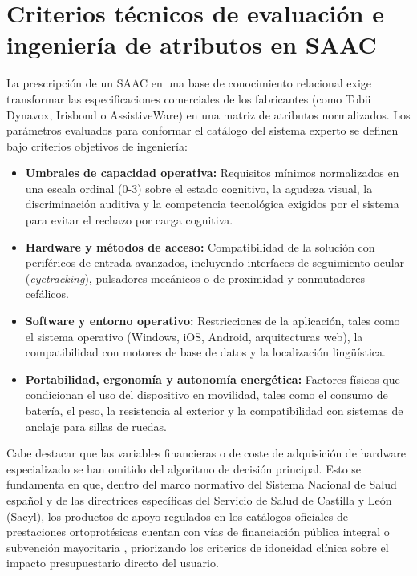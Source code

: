 \section{Criterios técnicos de evaluación e ingeniería de atributos en SAAC}
La prescripción de un SAAC en una base de conocimiento relacional exige transformar las especificaciones comerciales de los fabricantes (como Tobii Dynavox, Irisbond o AssistiveWare) \cite{tobiidynavox:products, irisbond:soluciones, assistiveware:proloquo} en una matriz de atributos normalizados. Los parámetros evaluados para conformar el catálogo del sistema experto se definen bajo criterios objetivos de ingeniería:

\begin{itemize}
    	\item \textbf{Umbrales de capacidad operativa:} Requisitos mínimos normalizados en una escala ordinal (0-3) sobre el estado cognitivo, la agudeza visual, la discriminación auditiva y la competencia tecnológica exigidos por el sistema para evitar el rechazo por carga cognitiva.
    	\item \textbf{Hardware y métodos de acceso:} Compatibilidad de la solución con periféricos de entrada avanzados, incluyendo interfaces de seguimiento ocular (\textit{eyetracking}), pulsadores mecánicos o de proximidad y conmutadores cefálicos.
    	\item \textbf{Software y entorno operativo:} Restricciones de la aplicación, tales como el sistema operativo (Windows, iOS, Android, arquitecturas web), la compatibilidad con motores de base de datos y la localización lingüística.
    	\item \textbf{Portabilidad, ergonomía y autonomía energética:} Factores físicos que condicionan el uso del dispositivo en movilidad, tales como el consumo de batería, el peso, la resistencia al exterior y la compatibilidad con sistemas de anclaje para sillas de ruedas.
\end{itemize}

Cabe destacar que las variables financieras o de coste de adquisición de hardware especializado se han omitido del algoritmo de decisión principal. Esto se fundamenta en que, dentro del marco normativo del Sistema Nacional de Salud español y de las directrices específicas del Servicio de Salud de Castilla y León (Sacyl), los productos de apoyo regulados en los catálogos oficiales de prestaciones ortoprotésicas cuentan con vías de financiación pública integral o subvención mayoritaria \cite{ceapat:productos}, priorizando los criterios de idoneidad clínica sobre el impacto presupuestario directo del usuario.

